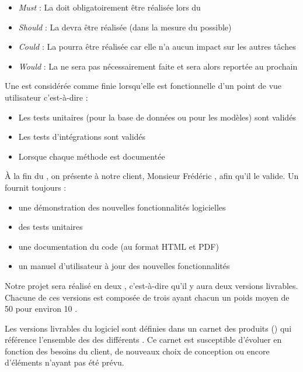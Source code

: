 \begin{itemize}
	\item \textit{Must} : La  doit obligatoirement être réalisée lors du 
	\item \textit{Should} : La  devra être réalisée (dans la mesure du possible)
	\item \textit{Could} : La  pourra être réalisée car elle n’a aucun impact sur les autres tâches
	\item \textit{Would} : La  ne sera pas nécessairement faite et sera alors reportée au prochain 
\end{itemize}

Une   est considérée comme finie lorsqu'elle est fonctionnelle d’un point de vue utilisateur c'est-à-dire :
\begin{itemize}
	\item Les tests unitaires (pour la base de données ou pour les modèles) sont validés
	\item Les tests d’intégrations sont validés
	\item Lorsque chaque méthode est documentée
\end{itemize}

À la fin du , on présente à notre client, Monsieur Frédéric , afin qu'il le valide. Un  fournit toujours :
\begin{itemize}
	\item une démonstration des nouvelles fonctionnalités logicielles
	\item des tests unitaires
	\item une documentation du code (au format HTML et PDF)
	\item un manuel d’utilisateur à jour des nouvelles fonctionnalités
\end{itemize}

Notre projet sera réalisé en deux , c'est-à-dire qu'il y aura deux versions livrables. Chacune de ces versions est composée de trois 
  ayant chacun un poids moyen de 50 pour environ 10 .

Les versions livrables du logiciel sont définies dans un carnet des produits () qui référence l'ensemble des  des
différents . Ce carnet est susceptible d’évoluer en fonction des besoins du client, de nouveaux choix de conception ou encore d’éléments
n’ayant pas été prévu. 


